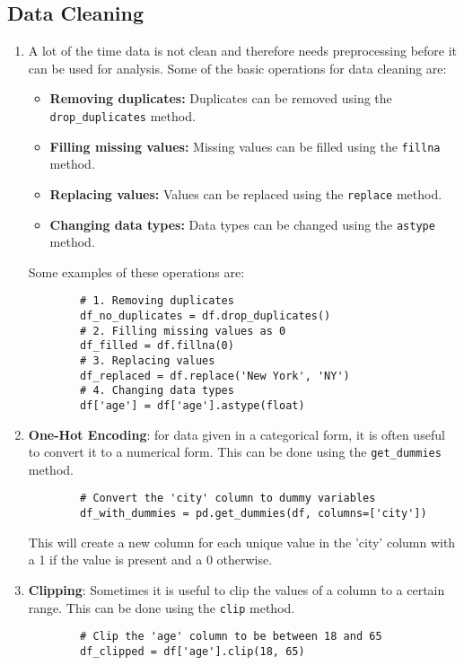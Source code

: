 \documentclass[letterpaper, 11pt]{article}
\newcommand{\1}{\mathds{1}}	%
\theoremstyle{definition}
\begin{document}
\subsection{Data Cleaning}
\begin{enumerate}
    \item A lot of the time data is not clean and therefore needs preprocessing before it can be used for analysis. Some of the basic 
    operations for data cleaning are:
    \begin{itemize}
        \item \textbf{Removing duplicates:} Duplicates can be removed using the \texttt{drop\_duplicates} method.
        \item \textbf{Filling missing values:} Missing values can be filled using the \texttt{fillna} method.
        \item \textbf{Replacing values:} Values can be replaced using the \texttt{replace} method.
        \item \textbf{Changing data types:} Data types can be changed using the \texttt{astype} method.
    \end{itemize}
    Some examples of these operations are:
    \begin{verbatim}
        # 1. Removing duplicates
        df_no_duplicates = df.drop_duplicates()
        # 2. Filling missing values as 0
        df_filled = df.fillna(0)
        # 3. Replacing values
        df_replaced = df.replace('New York', 'NY')
        # 4. Changing data types
        df['age'] = df['age'].astype(float)
    \end{verbatim}
    \item \textbf{One-Hot Encoding}: for data given in a categorical form, it is often useful to convert it to a numerical form. This can be done using the \texttt{get\_dummies} method.
    \begin{verbatim}
        # Convert the 'city' column to dummy variables
        df_with_dummies = pd.get_dummies(df, columns=['city'])
    \end{verbatim}
    This will create a new column for each unique value in the 'city' column with a 1 if the value is present and a 0 otherwise.
    \item \textbf{Clipping}: Sometimes it is useful to clip the values of a column to a certain range. This can be done using the \texttt{clip} method.
    \begin{verbatim}
        # Clip the 'age' column to be between 18 and 65
        df_clipped = df['age'].clip(18, 65)
    \end{verbatim}

\end{enumerate}
\end{document}
